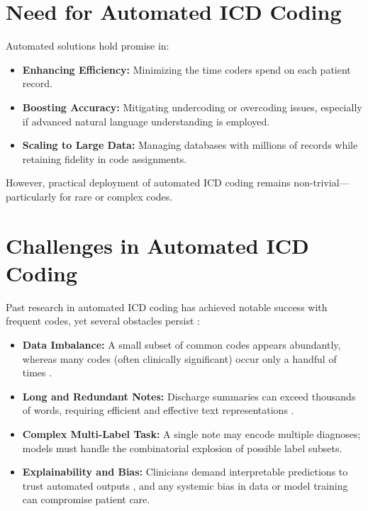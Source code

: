 \documentclass[12pt,a4paper]{report}
\begin{document}
\section{Need for Automated ICD Coding}
Automated solutions hold promise in:
\begin{itemize}
    \item \textbf{Enhancing Efficiency:} Minimizing the time coders spend on each patient record.
    \item \textbf{Boosting Accuracy:} Mitigating undercoding or overcoding issues, especially if advanced natural language understanding is employed.
    \item \textbf{Scaling to Large Data:} Managing databases with millions of records while retaining fidelity in code assignments.
\end{itemize}
However, practical deployment of automated ICD coding remains non-trivial—particularly for rare or complex codes.

\section{Challenges in Automated ICD Coding}
\label{sec:challenges-automated}
Past research in automated ICD coding has achieved notable success with frequent codes, yet several obstacles persist \cite{dong2022automated,edin2023automated}:
\begin{itemize}
    \item \textbf{Data Imbalance:} A small subset of common codes appears abundantly, whereas many codes (often clinically significant) occur only a handful of times \cite{rios2018few}.
    \item \textbf{Long and Redundant Notes:} Discharge summaries can exceed thousands of words, requiring efficient and effective text representations \cite{heo2022medical}.
    \item \textbf{Complex Multi-Label Task:} A single note may encode multiple diagnoses; models must handle the combinatorial explosion of possible label subsets.
    \item \textbf{Explainability and Bias:} Clinicians demand interpretable predictions to trust automated outputs \cite{holzinger2017we}, and any systemic bias in data or model training can compromise patient care.
\end{itemize}
\end{document}

